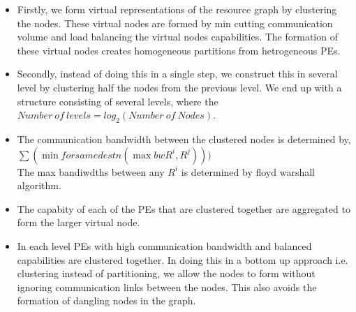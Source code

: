 \begin{itemize}

\item Firstly, we form virtual representations of the resource graph by
clustering the nodes. These virtual nodes are formed by min cutting
communication volume and load balancing the virtual nodes capabilities.
The formation of these virtual nodes creates homogeneous partitions
from hetrogeneous PEs.

\item Secondly, instead of doing this in a single step, we construct
this in several level by clustering half the nodes from the previous
level. We end up with a structure consisting of several levels, where
the $ Number\ of\ levels = log_2 ( Number\ of\ Nodes )$.

\item The communication bandwidth between the clustered nodes is
determined by,\\ ${ \sum ( \min for same destn ( \max bw R^i, R^j ) )
) }$\\ The max bandiwdths between any ${R^i}$ is determined by floyd
warshall algorithm.

\item The capabity of each of the PEs that are clustered together are
aggregated to form the larger virtual node.

\item In each level PEs with high communication bandwidth and balanced
capabilities are clustered together. In doing this in a bottom up
approach i.e. clustering instead of partitioning, we allow the nodes to
form without ignoring communication links between the nodes. This also
avoids the formation of dangling nodes in the graph.

\end{itemize}

